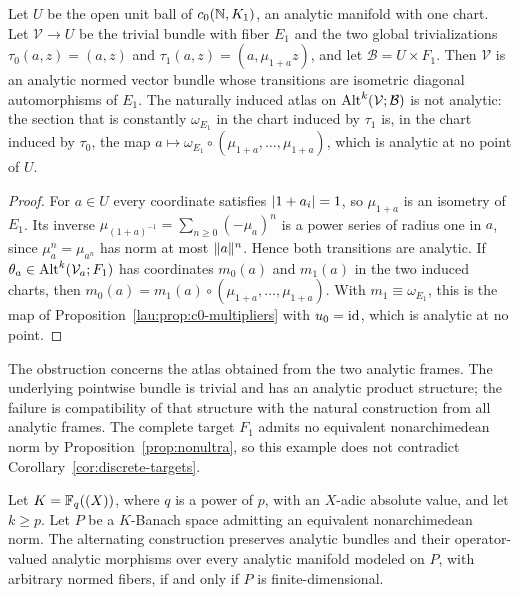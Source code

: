 \begin{corollary}\label{lau:cor:diagonal-bundle}
Let $U$ be the open unit ball of $c_0(\mathbb N,K_1)$, an analytic manifold with one chart. Let $\mathcal V\to U$ be the
trivial bundle with fiber $E_1$ and the two global trivializations $\tau_0(a,z)=(a,z)$ and $\tau_1(a,z)=(a,\mu_{1+a}z)$,
and let $\mathcal B=U\times F_1$. Then $\mathcal V$ is an analytic normed vector bundle whose transitions are isometric
diagonal automorphisms of $E_1$. The naturally induced atlas on $\operatorname{Alt}^k(\mathcal V;\mathcal B)$ is not analytic: the section
that is constantly $\omega_{E_1}$ in the chart induced by $\tau_1$ is, in the chart induced by $\tau_0$, the map
$a\mapsto \omega_{E_1}\circ(\mu_{1+a},\dots,\mu_{1+a})$, which is analytic at no point of $U$.
\end{corollary}

\begin{proof}
For $a\in U$ every coordinate satisfies $\lvert 1+a_i\rvert=1$, so $\mu_{1+a}$ is an isometry of $E_1$. Its inverse
$\mu_{(1+a)^{-1}}=\sum_{n\ge0}(-\mu_a)^n$ is a power series of radius one in $a$, since $\mu_a^n=\mu_{a^n}$ has norm at most
$\lVert a\rVert^n$. Hence both transitions are analytic. If $\theta_a\in\operatorname{Alt}^k(\mathcal V_a;F_1)$ has coordinates $m_0(a)$ and
$m_1(a)$ in the two induced charts, then $m_0(a)=m_1(a)\circ(\mu_{1+a},\dots,\mu_{1+a})$. With $m_1\equiv \omega_{E_1}$, this is the
map of Proposition~\ref{lau:prop:c0-multipliers} with $u_0=\mathrm{id}$, which is analytic at no point.
\end{proof}


The obstruction concerns the atlas obtained from the two analytic frames. The underlying pointwise bundle is trivial and has an analytic product structure; the failure is compatibility of that structure with the natural construction from all analytic frames. The complete target $F_1$ admits no equivalent nonarchimedean norm by Proposition~\ref{prop:nonultra}, so this example does not contradict Corollary~\ref{cor:discrete-targets}.

\begin{corollary}\label{lau:cor:dichotomy}
Let $K=\mathbb F_q((X))$, where $q$ is a power of $p$, with an $X$\nobreakdash-adic absolute value, and let $k\ge p$. Let $P$ be a $K$\nobreakdash-Banach space admitting an equivalent nonarchimedean norm. The alternating construction preserves analytic bundles and their operator-valued analytic morphisms over every analytic manifold modeled on $P$, with arbitrary normed fibers, if and only if $P$ is finite-dimensional.
\end{corollary}

